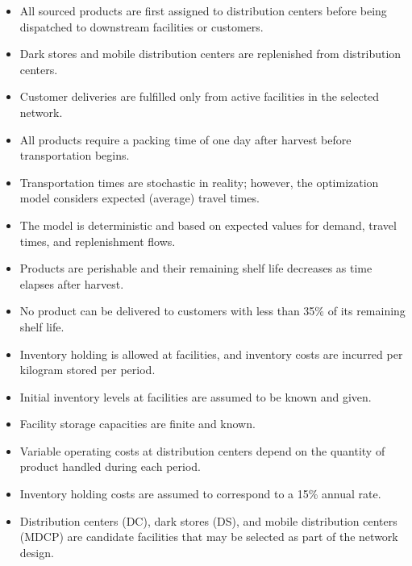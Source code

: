 \documentclass[12pt]{article}
\begin{document}
\begin{itemize}
    \item All sourced products are first assigned to distribution centers before being dispatched to downstream facilities or customers.

    \item Dark stores and mobile distribution centers are replenished from distribution centers.

    \item Customer deliveries are fulfilled only from active facilities in the selected network.

    \item All products require a packing time of one day after harvest before transportation begins.

    \item Transportation times are stochastic in reality; however, the optimization model considers expected (average) travel times.

    \item The model is deterministic and based on expected values for demand, travel times, and replenishment flows.

    \item Products are perishable and their remaining shelf life decreases as time elapses after harvest.

    \item No product can be delivered to customers with less than 35\% of its remaining shelf life.

    \item Inventory holding is allowed at facilities, and inventory costs are incurred per kilogram stored per period.

    \item Initial inventory levels at facilities are assumed to be known and given.

    \item Facility storage capacities are finite and known.

    \item Variable operating costs at distribution centers depend on the quantity of product handled during each period.

    \item Inventory holding costs are assumed to correspond to a 15\% annual rate.

    \item Distribution centers (DC), dark stores (DS), and mobile distribution centers (MDCP) are candidate facilities that may be selected as part of the network design.


\end{itemize}
\end{document}
